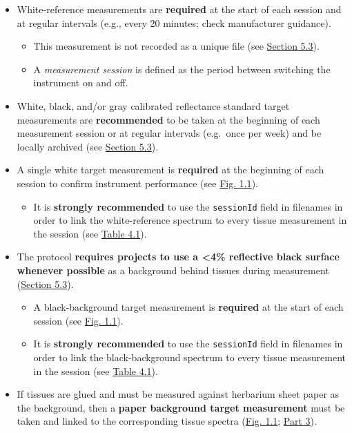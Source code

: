 \documentclass[
  letterpaper,
  DIV=11,
  numbers=noendperiod]{scrreprt}
\providecommand{\tightlist}{%
  \setlength{\itemsep}{0pt}\setlength{\parskip}{0pt}}
\begin{document}
\begin{itemize}
\item
  White-reference measurements are \textbf{required} at the start of
  each session and at regular intervals (e.g., every 20 minutes; check
  manufacturer guidance).

  \begin{itemize}
  \tightlist
  \item
    This measurement is not recorded as a unique file (see
    \hyperref[instrumentation-and-materials-quality-control]{Section
    5.3}).
  \item
    A \emph{measurement session} is defined as the period between
    switching the instrument on and off.
  \end{itemize}
\item
  White, black, and/or gray calibrated reflectance standard target
  measurements are \textbf{recommended} to be taken at the beginning of
  each measurement session or at regular intervals (e.g.~once per week)
  and be locally archived (see
  \hyperref[instrumentation-and-materials-quality-control]{Section
  5.3}).
\item
  A single white target measurement is \textbf{required} at the
  beginning of each session to confirm instrument performance (see
  \hyperref[f1-1]{Fig. 1.1}).

  \begin{itemize}
  \tightlist
  \item
    It is \textbf{strongly recommended} to use the \texttt{sessionId}
    field in filenames in order to link the white-reference spectrum to
    every tissue measurement in the session (see
    \hyperref[tbl-4-1]{Table 4.1}).
  \end{itemize}
\item
  The protocol \textbf{requires projects to use a \textless4\%
  reflective black surface whenever possible} as a background behind
  tissues during measurement
  (\hyperref[instrumentation-and-materials-quality-control]{Section
  5.3}).

  \begin{itemize}
  \tightlist
  \item
    A black-background target measurement is \textbf{required} at the
    start of each session (see \hyperref[f1-1]{Fig. 1.1}).
  \item
    It is \textbf{strongly recommended} to use the \texttt{sessionId}
    field in filenames in order to link the black-background spectrum to
    every tissue measurement in the session (see
    \hyperref[tbl-4-1]{Table 4.1}).
  \end{itemize}
\item
  If tissues are glued and must be measured against herbarium sheet
  paper as the background, then a \textbf{paper background target
  measurement} must be taken and linked to the corresponding tissue
  spectra (\hyperref[f1-1]{Fig. 1.1}; \href{part3-filenames.qmd}{Part
  3}).
\end{itemize}
\end{document}
